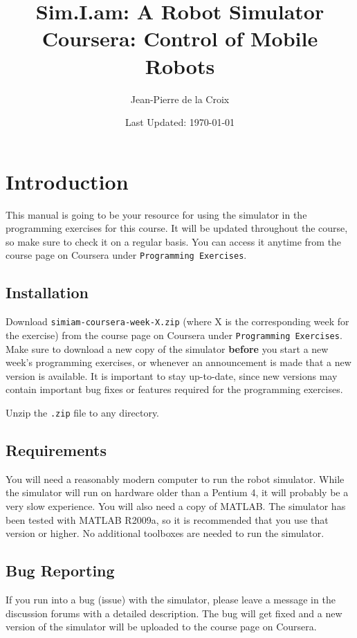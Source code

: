 \documentclass[10pt]{article}
\begin{document}
\title{{\huge{\bf{Sim.I.am: A Robot Simulator }}}\\
{{Coursera: Control of Mobile Robots}}}
\author{Jean-Pierre de la Croix}
\date{Last Updated: \today}

\maketitle
\tableofcontents
\newpage
\section{Introduction}
This manual is going to be your resource for using the simulator in the programming exercises for this course. It will be updated throughout the course, so make sure to check it on a regular basis. You can access it anytime from the course page on Coursera under \texttt{Programming Exercises}.

\subsection{Installation}

Download \texttt{simiam-coursera-week-X.zip} (where X is the corresponding week for the exercise) from the course page on Coursera under \texttt{Programming Exercises}. Make sure to download a new copy of the simulator \textbf{before} you start a new week's programming exercises, or whenever an announcement is made that a new version is available. It is important to stay up-to-date, since new versions may contain important bug fixes or features required for the programming exercises.

Unzip the \texttt{.zip} file to any directory.

\subsection{Requirements}

You will need a reasonably modern computer to run the robot simulator. While the simulator will run on hardware older than a Pentium 4, it will probably be a very slow experience. You will also need a copy of MATLAB. The simulator has been tested with MATLAB R2009a, so it is recommended that you use that version or higher. No additional toolboxes are needed to run the simulator.

\subsection{Bug Reporting}
If you run into a bug (issue) with the simulator, please leave a message in the discussion forums with a detailed description. The bug will get fixed and a new version of the simulator will be uploaded to the course page on Coursera.
\end{document}
